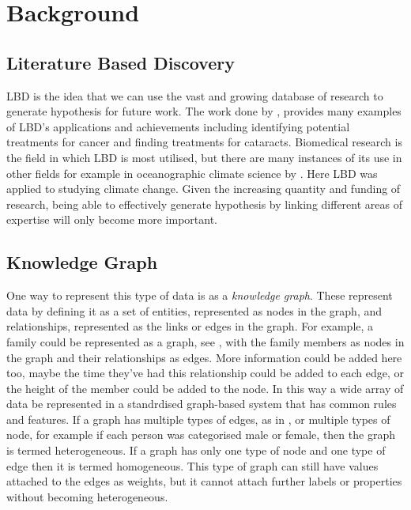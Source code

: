 \documentclass{l4proj}
\begin{document}
\chapter{Background}

\section{Literature Based Discovery}

LBD is the idea that we can use the vast and growing database of research to generate hypothesis for future work. The work done by \cite{henry_literature_2017}, provides many examples of LBD's applications and achievements including identifying potential treatments for cancer and finding treatments for cataracts. Biomedical research is the field in which LBD is most utilised, but there are many instances of its use in other fields for example in oceanographic climate science by \cite{aamot_literature-based_2014}. Here LBD was applied to  studying climate change. Given the increasing quantity and funding of research, being able to effectively generate hypothesis by linking different areas of expertise will only become more important.\\  

\section{Knowledge Graph}

One way to represent this type of data is as a \textit{knowledge graph}. These represent data by defining it as a set of entities, represented as nodes in the graph, and relationships, represented as the links or edges in the graph. For example, a family could be represented as a graph, see , with the family members as nodes in the graph and their relationships as edges. More information could be added here too, maybe the time they've had this relationship could be added to each edge, or the height of the member could be added to the node. In this way a wide array of data be represented in a standrdised graph-based system that has common rules and features. If a graph has multiple types of edges, as in , or multiple types of node, for example if each person was categorised male or female, then the graph is termed heterogeneous. If a graph has only one type of node and one type of edge then it is termed homogeneous. This type of graph can still have values attached to the edges as weights, but it cannot attach further labels or properties without becoming heterogeneous. \\ 
\end{document}
